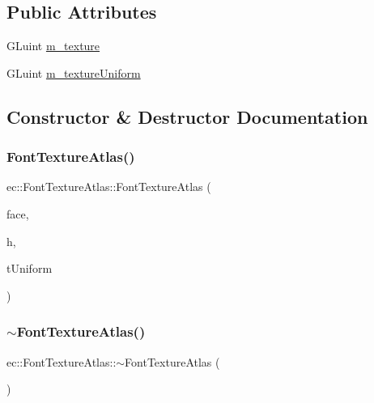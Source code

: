 \subsection*{Public Attributes}
\begin{DoxyCompactItemize}
\item 
G\+Luint \mbox{\hyperlink{classec_1_1_font_texture_atlas_a97620bab980c2f73e90928c1c9ec405a}{m\+\_\+texture}}
\item 
G\+Luint \mbox{\hyperlink{classec_1_1_font_texture_atlas_a0ad591b30c2e288d31f4ab9e18acb887}{m\+\_\+texture\+Uniform}}
\end{DoxyCompactItemize}


\subsection{Constructor \& Destructor Documentation}
\mbox{\label{classec_1_1_font_texture_atlas_abf42f99b2562130eb9b347c895cf14f3}} 
\subsubsection{\texorpdfstring{Font\+Texture\+Atlas()}{FontTextureAtlas()}}
{\footnotesize\ttfamily ec\+::\+Font\+Texture\+Atlas\+::\+Font\+Texture\+Atlas (\begin{DoxyParamCaption}\item[{F\+T\+\_\+\+Face}]{face,  }\item[{int}]{h,  }\item[{G\+Luint}]{t\+Uniform }\end{DoxyParamCaption})}

\mbox{\label{classec_1_1_font_texture_atlas_a9e520505ca5bd5b9cabe27448d285449}} 
\subsubsection{\texorpdfstring{$\sim$\+Font\+Texture\+Atlas()}{~FontTextureAtlas()}}
{\footnotesize\ttfamily ec\+::\+Font\+Texture\+Atlas\+::$\sim$\+Font\+Texture\+Atlas (\begin{DoxyParamCaption}{ }\end{DoxyParamCaption})}



